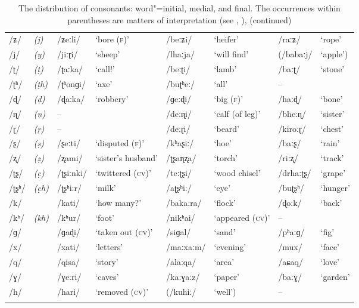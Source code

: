 \addtocounter{table}{-1}
\begin{sidewaystable}[p!]
\caption{The distribution of consonants: word"=initial, medial, and final. The occurrences within parentheses are matters of interpretation (see , ), (continued)}
\begin{tabularx}{\textwidth}{ l@{\hspace{20pt}} l@{\hspace{20pt}} Q l@{\hspace{20pt}} Q Q Q Q }
\lsptoprule
/ʑ/ &
\textit{(ǰ)} &
/ʑeːli/ &
`bore (\textsc{f)}' &
/beːʑi/ &
`heifer' &
/raːʑ/ &
`rope'\\
/j/ &
\textit{(y)} &
/jiːɽi/ &
`sheep' &
/lhaːja/ &
`will find' &
(/babaːj/ &
`apple')\\
/ʈ/ &
\textit{(ṭ)} &
/ʈaːka/ &
`call!' &
/beːʈi/ &
`lamb' &
/baːʈ/ &
`stone'\\
/ʈʰ/ &
\textit{(ṭh)} &
/ʈʰonɡi/ &
`axe' &
/buʈʰeː/ &
`all' &
-- &
\\
/ɖ/ &
\textit{(ḍ)} &
/ɖaːka/ &
`robbery' &
/ɡeːɖi/ &
`big (\textsc{f)}' &
/haːɖ/ &
`bone'\\
/ɳ/ &
\textit{(ṇ)} &
-- &
&
/deːɳi/ &
`calf (of leg)' &
/bheːɳ/ &
`sister'\\
/ɽ/ &
\textit{(ṛ)} &
-- &
&
/deːɽi/ &
`beard' &
/kiroːɽ/ &
`chest'\\
/ʂ/ &
\textit{(ṣ)} &
/ʂeːti/ &
`disputed (\textsc{f)}' &
/kʰaʂiː/ &
`hoe' &
/baːʂ/ &
`rain'\\
/ʐ/ &
\textit{(ẓ)} &
/ʐami/ &
`sister's husband' &
/ʈʂaɳʐa/ &
`torch' &
/riːʐ/ &
`track'\\
/ʈʂ/ &
\textit{(c̣)} &
/ʈʂiːnki/ &
`twittered (\textsc{cv)}' &
/teːʈʂi/ &
`wood chisel' &
/drhaːʈʂ/ &
`grape'\\
/ʈʂʰ/ &
\textit{(c̣h)} &
/ʈʂʰiːr/ &
`milk' &
/aʈʂʰiː/ &
`eye' &
/buʈʂʰ/ &
`hunger'\\
/k/ &
&
/kati/ &
`how many?' &
/bakaːra/ &
`flock' &
/ɖoːk/ &
`back'\\
/kʰ/ &
\textit{(kh)} &
/kʰur/ &
`foot' &
/nikʰai/ &
`appeared (\textsc{cv)}'  &
-- &
\\
/ɡ/ &
&
/ɡaɖi/ &
`taken out (\textsc{cv)}' &
/siɡal/ &
`sand' &
/pʰaːɡ/ &
`fig'\\
/x/ &
&
/xati/ &
`letters' &
/maːxaːm/ &
`evening' &
/mux/ &
`face'\\
/q/ &
&
/qisa/ &
`story' &
/alaːqa/ &
`area' &
/aɕaq/ &
`love'\\
/ɣ/ &
&
/ɣeːri/ &
`caves' &
/kaːɣaːz/ &
`paper' &
/baːɣ/ &
`garden'\\
/h/ &
&
/hari/ &
`removed \textsc{(cv)}' &
(/kuhiː/ &
`well') &
-- &
\\\lspbottomrule
\end{tabularx}
\label{tab:3-2}
\end{sidewaystable}

